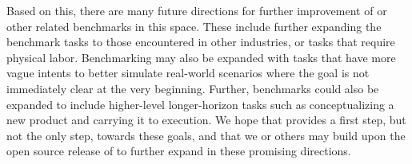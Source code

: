 \documentclass{article}
\begin{document}
Based on this, there are many future directions for further improvement of \tac or other related benchmarks in this space.
These include further expanding the benchmark tasks to those encountered in other industries, or tasks that require physical labor.
Benchmarking may also be expanded with tasks that have more vague intents to better simulate real-world scenarios where the goal is not immediately clear at the very beginning.
Further, benchmarks could also be expanded to include higher-level longer-horizon tasks such as conceptualizing a new product and carrying it to execution.
We hope that \tac provides a first step, but not the only step, towards these goals, and that we or others may build upon the open source release of \tac to further expand in these promising directions.


\end{document}
